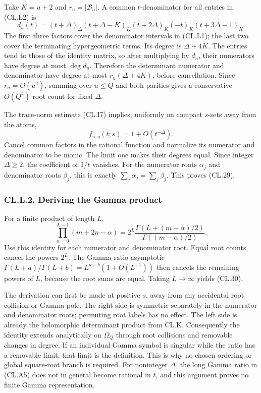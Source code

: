 \documentclass[a4paper,11pt]{article}
\numberwithin{equation}{section}
\begin{document}
Take \(K=u+2\) and \(r_u=|\mathcal B_u|\). A common \(t\)-denominator for all entries in (CL.L2) is \[
d_u(t)=
(t+\Delta)_\Delta
(t+\Delta-K)_K(t+2\Delta)_K
(-t)_K(t+3\Delta-1)_K.
\tag{CL.L3}
\] The first three factors cover the denominator intervals in (CL.L1); the last two cover the terminating hypergeometric terms. Its degree is \(\Delta+4K\). The entries tend to those of the identity matrix, so after multiplying by \(d_u\), their numerators have degree at most \(\deg d_u\). Therefore the determinant numerator and denominator have degree at most \(r_u(\Delta+4K)\), before cancellation. Since \(r_u=O(u^2)\), summing over \(u\leq Q\) and both parities gives a conservative \(O(Q^4)\) root count for fixed \(\Delta\).

The trace-norm estimate (CL.I7) implies, uniformly on compact \(s\)-sets away from the atoms, \[
f_{u,\eta}(t;s)=1+O(t^{-\Delta}).
\tag{CL.L4}
\] Cancel common factors in the rational function and normalize its numerator and denominator to be monic. The limit one makes their degrees equal. Since integer \(\Delta\geq2\), the coefficient of \(1/t\) vanishes. For the numerator roots \(\alpha_j\) and denominator roots \(\beta_j\), this is exactly \(\sum_j\alpha_j=\sum_j\beta_j\). This proves (CL.29).

\hypertarget{cl.l.2.-deriving-the-gamma-product}{%
\subsubsection{CL.L.2. Deriving the Gamma product}\label{cl.l.2.-deriving-the-gamma-product}}

For a finite product of length \(L\), \[
\prod_{n=0}^{L-1}(m+2n-\alpha)
=2^L\frac{\Gamma(L+(m-\alpha)/2)}
{\Gamma((m-\alpha)/2)}.
\] Use this identity for each numerator and denominator root. Equal root counts cancel the powers \(2^L\). The Gamma ratio asymptotic \(\Gamma(L+a)/\Gamma(L+b)=L^{a-b}(1+O(L^{-1}))\) then cancels the remaining powers of \(L\), because the root sums are equal. Taking \(L\to\infty\) yields (CL.30).

The derivation can first be made at positive \(s\), away from any accidental root collision or Gamma pole. The right side is symmetric separately in the numerator and denominator roots; permuting root labels has no effect. The left side is already the holomorphic determinant product from CL.K. Consequently the identity extends analytically on \(\Omega_Q\) through root collisions and removable changes in degree. If an individual Gamma symbol is singular while the ratio has a removable limit, that limit is the definition. This is why no chosen ordering or global square-root branch is required. For noninteger \(\Delta\), the long Gamma ratio in (CL.A5) does not in general become rational in \(t\), and this argument proves no finite Gamma representation.
\end{document}
